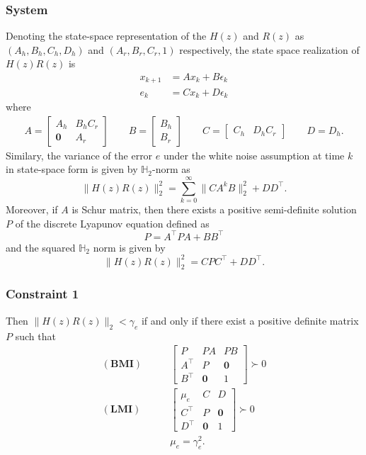 \documentclass[a4paper]{article}
\begin{document}
\subsubsection{System}
Denoting the state-space representation of the $H(z)$ and $R(z)$ as $(A_{h}, B_{h}, C_{h}, D_{h})$ and $(A_{r}, B_{r}, C_{r}, 1)$ respectively, the state space realization of $H(z)R(z)$ is 
\begin{align}
	x_{k+1} &= Ax_{k} + B \epsilon_{k} \\
	e_{k} &= Cx_{k} + D\epsilon_{k}
\end{align}
where 
\begin{align}
	A = \begin{bmatrix}
		A_{h} & B_{h}C_{r}\\
		\mathbf{0} & A_{r}
	\end{bmatrix}
	\qquad
	B = \begin{bmatrix}
		B_{h} \\
		B_{r}
	\end{bmatrix}
	\qquad
	C = \begin{bmatrix}
		C_{h} & D_{h} C_{r}
	\end{bmatrix}
	\qquad
	D = D_{h}.
\end{align}
Similary, the variance of the error $e$ under the white noise assumption at time $k$ in state-space form is given by $\mathbb{H}_{2}$-norm  as
\begin{equation}
	\|H(z)R(z)\|_{2}^{2} = \sum_{k = 0}^{\infty} \|C A^{k}B\|_{2}^{2} + DD^{\top}.
\end{equation}
Moreover, if $A$ is Schur matrix, then there exists a positive semi-definite solution $P$ of the discrete Lyapunov equation defined as 
\begin{equation}
	P = A^{\top} P A + B B^{\top}
\end{equation}
and the squared $\mathbb{H}_{2}$ norm is given by
\begin{equation}
		\|H(z)R(z)\|_{2}^{2} = C P C^{\top} + D D^{\top}.
\end{equation}
\subsubsection{Constraint 1}
Then $\|H(z) R(z)\|_{2} < \gamma_{e}$ if and only if there exist a positive definite matrix $P$ such that 
\begin{align}
	 \mathbf{(BMI)} \qquad &\begin{bmatrix}
		P & PA & PB \\
		A^{\top} & P & \mathbf{0} \\
		B^{\top} & \mathbf{0} & 1
	\end{bmatrix} \succ 0 \\
	\mathbf{(LMI)} \qquad &\begin{bmatrix}
		\mu_{e} & C & D \\
		C^{\top} & P & \mathbf{0} \\
		D^{\top} & \mathbf{0} & 1
	\end{bmatrix} \succ 0 \\
&\mu_{e} = \gamma_{e}^{2}.
\end{align}
\end{document}
